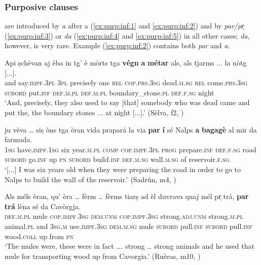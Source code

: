\subsubsection{Purposive clauses}\label{sec:6.2.2.3}
 are introduced by \textit{a} after a  (\ref{ex:purp:inf:1} and \ref{ex:purp:inf:2}) and by \textit{par/pr̩} (\ref{ex:purp:inf:3}) or \textit{da} (\ref{ex:purp:inf:4} and \ref{ex:purp:inf:5}) in all other cases; \textit{da}, however, is very rare. Example (\ref{ex:purp:inf:2}) contains both \textit{par} and \textit{a}.

\ea\label{ex:purp:inf:1}
\gll  Api ṣchèvan aj èba in tg’ è mòrts tga \textbf{végn} \textbf{a} \textbf{métar} als, als tjarms ... la nòtg [...].\\
and say.\textsc{impf.3pl} \textsc{3pl} precisely one \textsc{rel} \textsc{cop.prs.3sg} dead.\textsc{m.sg} \textsc{rel} come.\textsc{prs.3sg} \textsc{subord} put.\textsc{inf} \textsc{def.m.pl} \textsc{def.m.pl} boundary\_stone.\textsc{pl} {} \textsc{def.f.sg} night \\
\glt `And, precisely, they also used to say [that] somebody who was dead came and put the, the boundary stones ... at night [...].' (Sèlva, f2, )
\z

\ea
\label{ex:purp:inf:2}
\gll [...] ju vèva … siṣ òns tga èran vida prapará la via \textbf{par} \textbf{í} sé Nalps \textbf{a} \textbf{bagagè} al mir da farmada.\\
{} \textsc{1sg} have.\textsc{impf.1sg} {} six year.\textsc{m.pl} \textsc{comp} \textsc{cop.impf.3pl} \textsc{prog} prepare.\textsc{inf} \textsc{def.f.sg} road \textsc{subord} go.\textsc{inf} up \textsc{pn} \textsc{subord} build.\textsc{inf} \textsc{def.m.sg} wall.\textsc{m.sg} of reservoir.\textsc{f.sg} \\ 
\glt `[...] I was six years old when they were preparing the road in order to go to Nalps to build the wall of the reservoir.' (Sadrún, m4, )
\z

\ea
\label{ex:purp:inf:3}
\gll Als méls èran, qu’ èra … fèrm … fèrms tiarṣ ad èl duvrava quaj mél pr̩ trá, \textbf{par} \textbf{trá} lèna sé da Cavòrgja.\\
\textsc{def.m.pl} mule \textsc{cop.impf.3sg} \textsc{dem.unm} \textsc{cop.impf.3sg} {} strong.\textsc{adj.unm} {} strong.\textsc{m.pl} animal.\textsc{pl} and \textsc{3sg.m} use.\textsc{impf.3sg} \textsc{dem.m.sg} mule \textsc{subord} pull.\textsc{inf} \textsc{subord} pull.\textsc{inf} wood.\textsc{coll} up from \textsc{pn}\\
\glt `The mules were, these were in fact …. strong … strong animals and he used that mule for transporting wood up from Cavorgia.' (Ruèras, m10, )
\z

